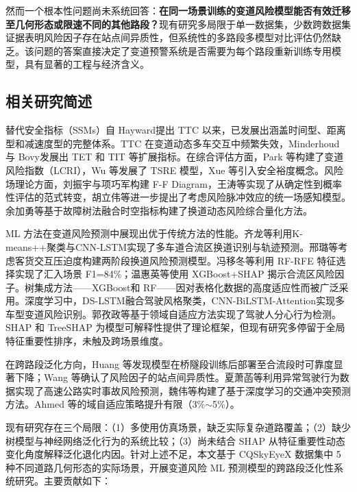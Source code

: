 \documentclass[preprint,review,12pt,a4paper]{elsarticle}
\begin{document}
然而一个根本性问题尚未系统回答：\textbf{在同一场景训练的变道风险模型能否有效迁移至几何形态或限速不同的其他路段？}现有研究多局限于单一数据集\cite{C15}，少数跨数据集证据表明风险因子存在站点间异质性\cite{C16}，但系统性的多路段多模型对比评估仍然缺乏。该问题的答案直接决定了变道预警系统是否需要为每个路段重新训练专用模型，具有显著的工程与经济含义。

\subsection{相关研究简述}

替代安全指标（SSMs）自 Hayward\cite{C05}提出 TTC 以来，已发展出涵盖时间型、距离型和减速度型的完整体系\cite{C18}。TTC 在变道动态多车交互中频繁失效\cite{C01}，Minderhoud 与 Bovy\cite{C06}发展出 TET 和 TIT 等扩展指标。在综合评估方面，Park 等\cite{C08}构建了变道风险指数（LCRI），Wu 等\cite{C03}发展了 TSRE 模型，Xue 等\cite{C02}引入安全裕度概念。风险场理论方面，刘振宇与项巧军\cite{C01}构建 F-F Diagram，王涛等\cite{C07}实现了从确定性到概率性评估的范式转变，胡立伟等\cite{C29}进一步提出了考虑风险脉冲效应的统一场感知模型。余加勇等\cite{C26}基于故障树法融合时空指标构建了换道动态风险综合量化方法。

ML 方法在变道风险预测中展现出优于传统方法的性能。齐龙等\cite{C30}利用K-means++聚类与CNN-LSTM实现了多车道合流区换道识别与轨迹预测。邢璐等\cite{C31}考虑客货交互压迫度构建两阶段换道风险预测模型。冯移冬等\cite{C09}利用 RF-RFE 特征选择实现了汇入场景 F1=84\%；温惠英等\cite{C10}使用 XGBoost+SHAP 揭示合流区风险因子。树集成方法——XGBoost\cite{C19}和 RF\cite{C20}——因对表格化数据的高度适应性而被广泛采用。深度学习中，DS-LSTM\cite{C11}融合驾驶风格聚类，CNN-BiLSTM-Attention\cite{C12}实现多车型变道风险识别。郭孜政等\cite{C28}基于领域自适应方法实现了驾驶人分心行为检测。SHAP\cite{C13} 和 TreeSHAP\cite{C14} 为模型可解释性提供了理论框架，但现有研究多停留于全局特征重要性排序，未触及跨场景维度。

在跨路段泛化方向，Huang 等\cite{C22}发现模型在桥隧段训练后部署至合流段时可靠度显著下降；Wang 等\cite{C16}确认了风险因子的站点间异质性。夏萧菡等\cite{C32}利用异常驾驶行为数据实现了高速公路实时事故风险预测，魏伟等\cite{C34}构建了基于深度学习的交通冲突预测方法。Ahmed 等\cite{C23}的域自适应策略提升有限（3\%$\sim$5\%）。

现有研究存在三个局限：（1）多使用仿真场景，缺乏实际复杂道路覆盖；（2）缺少树模型与神经网络泛化行为的系统比较；（3）尚未结合 SHAP 从特征重要性动态变化角度解释泛化退化内因。针对上述不足，本文基于 CQSkyEyeX 数据集\cite{C17}中 5 种不同道路几何形态的实际场景，开展变道风险 ML 预测模型的跨路段泛化性系统研究。主要贡献如下：
\end{document}
